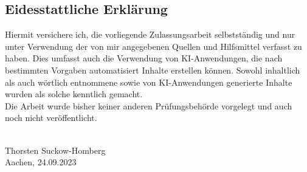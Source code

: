\thispagestyle{empty}
\pagebreak
\hspace{0pt}
\vfill

\subsection*{Eidesstattliche Erklärung}
Hiermit versichere ich, die vorliegende Zulassungsarbeit selbstständig und nur unter
Verwendung der von mir angegebenen Quellen und Hilfsmittel verfasst zu haben.
Dies umfasst auch die Verwendung von KI-Anwendungen, die nach bestimmten Vorgaben
automatisiert Inhalte erstellen können.
Sowohl inhaltlich als auch wörtlich entnommene sowie
von KI-Anwendungen generierte Inhalte wurden als solche kenntlich gemacht.\\

Die Arbeit wurde bisher keiner anderen Prüfungsbehörde vorgelegt und auch noch nicht veröffentlicht.\\


\begin{center}
\underline{\hspace{6cm}}\\
Thorsten Suckow-Homberg \\Aachen, 24.09.2023
\end{center}


\vfill
\hspace{0pt}
\pagebreak
